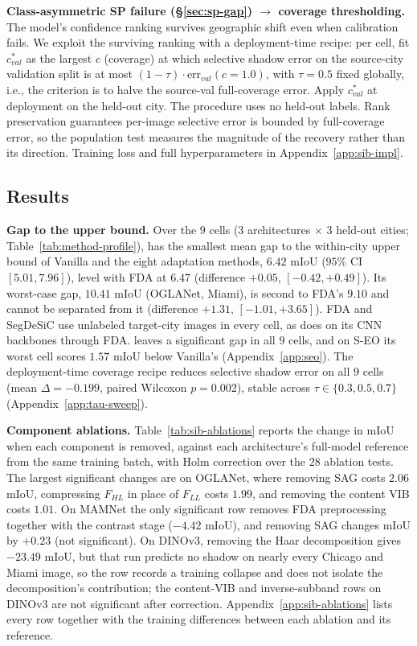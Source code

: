\textbf{Class-asymmetric SP failure (\S\ref{sec:sp-gap}) $\rightarrow$ coverage thresholding.} The model's confidence ranking survives geographic shift even when calibration fails. We exploit the surviving ranking with a deployment-time recipe: per cell, fit $c^*_{val}$ as the largest $c$ (coverage) at which selective shadow error on the source-city validation split is at most $(1-\tau) \cdot \text{err}_{val}(c{=}1.0)$, with $\tau = 0.5$ fixed globally, i.e., the criterion is to halve the source-val full-coverage error. Apply $c^*_{val}$ at deployment on the held-out city. The procedure uses no held-out labels. Rank preservation guarantees per-image selective error is bounded by full-coverage error, so the population test measures the magnitude of the recovery rather than its direction. Training loss and full hyperparameters in Appendix~\ref{app:sib-impl}.

\subsection{Results}
\label{sec:sib-results}



\textbf{Gap to the upper bound.} Over the $9$ cells (3 architectures $\times$ 3 held-out cities; Table~\ref{tab:method-profile}), \sib{} has the smallest mean gap to the within-city upper bound of Vanilla and the eight adaptation methods, $6.42$ mIoU ($95\%$ CI $[5.01, 7.96]$), level with FDA at $6.47$ (difference $+0.05$, $[-0.42, +0.49]$). Its worst-case gap, $10.41$ mIoU (OGLANet, Miami), is second to FDA's $9.10$ and cannot be separated from it (difference $+1.31$, $[-1.01, +3.65]$). FDA and SegDeSiC use unlabeled target-city images in every cell, as \sib{} does on its CNN backbones through FDA. \sib{} leaves a significant gap in all $9$ cells, and on S-EO its worst cell scores $1.57$ mIoU below Vanilla's (Appendix~\ref{app:seo}). The deployment-time coverage recipe reduces selective shadow error on all $9$ cells (mean $\Delta = -0.199$, paired Wilcoxon $p = 0.002$), stable across $\tau \in \{0.3, 0.5, 0.7\}$ (Appendix~\ref{app:tau-sweep}).

\textbf{Component ablations.} Table~\ref{tab:sib-ablations} reports the change in mIoU when each \sib{} component is removed, against each architecture's full-model reference from the same training batch, with Holm correction over the $28$ ablation tests. The largest significant changes are on OGLANet, where removing SAG costs $2.06$ mIoU, compressing $F_{HL}$ in place of $F_{LL}$ costs $1.99$, and removing the content VIB costs $1.01$. On MAMNet the only significant row removes FDA preprocessing together with the contrast stage ($-4.42$ mIoU), and removing SAG changes mIoU by $+0.23$ (not significant). On DINOv3, removing the Haar decomposition gives $-23.49$ mIoU, but that run predicts no shadow on nearly every Chicago and Miami image, so the row records a training collapse and does not isolate the decomposition's contribution; the content-VIB and inverse-subband rows on DINOv3 are not significant after correction. Appendix~\ref{app:sib-ablations} lists every row together with the training differences between each ablation and its reference.

